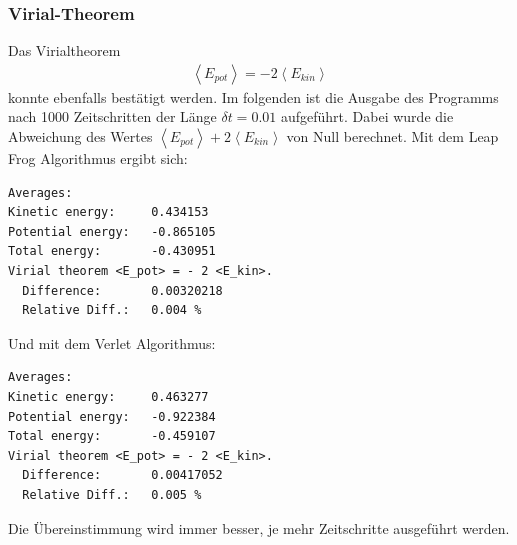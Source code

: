 \documentclass[a4paper,11pt]{scrartcl}
\begin{document}
\subsubsection*{Virial-Theorem} %
\label{ssub:virial_theorem}
Das Virialtheorem \begin{align}
	\left\langle E_{pot} \right\rangle  = - 2 \left\langle E_{kin} \right\rangle 
\end{align}
konnte ebenfalls bestätigt werden. Im folgenden ist die Ausgabe des Programms nach 1000 Zeitschritten der Länge $\delta t = 0.01$ aufgeführt. Dabei wurde die Abweichung des Wertes $\left\langle E_{pot} \right\rangle  + 2 \left\langle E_{kin} \right\rangle$ von Null berechnet. Mit dem Leap Frog Algorithmus ergibt sich:
\begin{lstlisting}
Averages:
Kinetic energy:		0.434153
Potential energy:	-0.865105
Total energy:		-0.430951
Virial theorem <E_pot> = - 2 <E_kin>.
  Difference:		0.00320218
  Relative Diff.:	0.004 %
\end{lstlisting}
Und mit dem Verlet Algorithmus:
\begin{lstlisting}
Averages:
Kinetic energy:		0.463277
Potential energy:	-0.922384
Total energy:		-0.459107
Virial theorem <E_pot> = - 2 <E_kin>.
  Difference:		0.00417052
  Relative Diff.:	0.005 %
\end{lstlisting}
Die Übereinstimmung wird immer besser, je mehr Zeitschritte ausgeführt werden.
\end{document}
